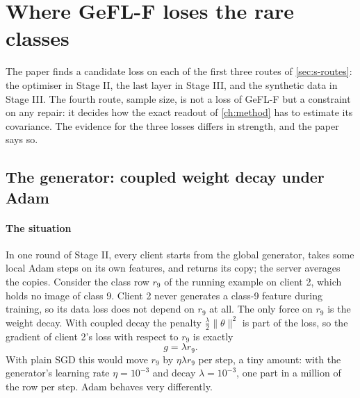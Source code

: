 \section{Where GeFL-F loses the rare classes}\label{ch:diagnosis}

The paper finds a candidate loss on each of the first three routes of \cref{sec:s-routes}: the optimiser in Stage II,
the last layer in Stage III, and the synthetic data in Stage III. The fourth route, sample size, is not a loss of
GeFL-F but a constraint on any repair: it decides how the exact readout of \cref{ch:method} has to estimate its
covariance. The evidence for the three losses differs in strength, and the paper says so.

\subsection{The generator: coupled weight decay under Adam}\label{sec:s-decay}

\paragraph{The situation} In one round of Stage II, every client starts from the global generator, takes some local
Adam steps on its own features, and returns its copy; the server averages the copies. Consider the class row $r_9$ of
the running example on client 2, which holds no image of class 9. Client 2 never generates a class-9 feature during
training, so its data loss does not depend on $r_9$ at all. The only force on $r_9$ is the weight decay. With coupled
decay the penalty $\frac\lambda2\|\theta\|^2$ is part of the loss, so the gradient of client 2's loss with respect to
$r_9$ is exactly
\[
g=\lambda r_9 .
\]
With plain SGD this would move $r_9$ by $\eta\lambda r_9$ per step, a tiny amount: with the generator's learning rate
$\eta=10^{-3}$ and decay $\lambda=10^{-3}$, one part in a million of the row per step. Adam behaves very differently.

